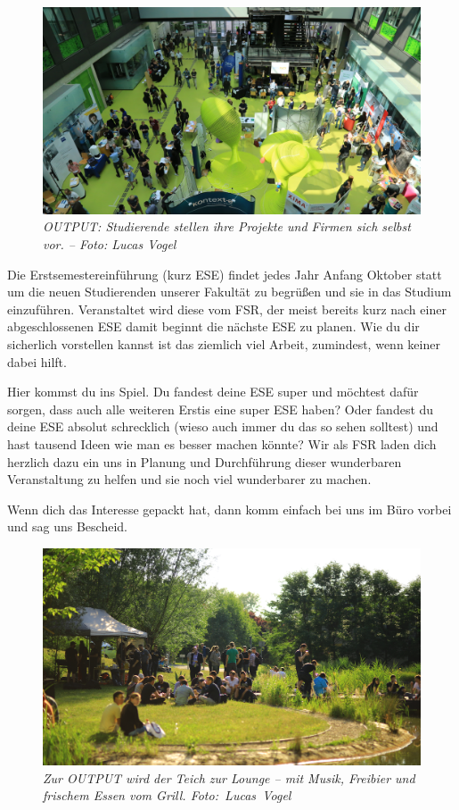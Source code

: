 \begin{figure}[b!]
	\centering
  \includegraphics[width=\linewidth]{img/output}
  \caption*{\small \centering \textit{OUTPUT\@: Studierende stellen ihre Projekte und Firmen sich selbst vor. -- Foto: Lucas Vogel}}
\end{figure}%


Die Erstsemestereinführung (kurz ESE) findet jedes Jahr Anfang Oktober statt um die neuen Studierenden unserer Fakultät zu begrüßen und sie in das Studium einzuführen. Veranstaltet wird diese vom FSR, der meist bereits kurz nach einer abgeschlossenen ESE damit beginnt die nächste ESE zu planen. Wie du dir sicherlich vorstellen kannst ist das ziemlich viel Arbeit, zumindest, wenn keiner dabei hilft.

Hier kommst du ins Spiel. Du fandest deine ESE super und möchtest dafür sorgen, dass auch alle weiteren Erstis eine super ESE haben? Oder fandest du deine ESE absolut schrecklich (wieso auch immer du das so sehen solltest) und hast tausend Ideen wie man es besser machen könnte? Wir als FSR laden dich herzlich dazu ein uns in Planung und Durchführung dieser wunderbaren Veranstaltung zu helfen und sie noch viel wunderbarer zu machen.

Wenn dich das Interesse gepackt hat, dann komm einfach bei uns im Büro vorbei und sag uns Bescheid.

\begin{figure}[b!]
  \centering
  \includegraphics[width=\linewidth]{img/output_pond}
  \caption*{\small \centering \textit{Zur OUTPUT wird der Teich zur Lounge -- mit Musik, Freibier und frischem Essen vom Grill. Foto:~Lucas~Vogel}}
\end{figure}


